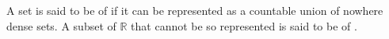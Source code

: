 A set is said to be of  if it can be represented as a countable union of nowhere dense sets. A subset of $\mathbb{R}$ that cannot be so represented is said to be of .
